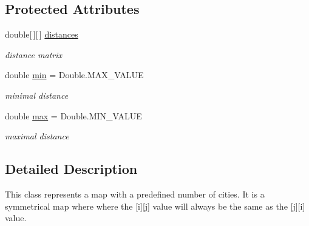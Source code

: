 \subsection*{Protected Attributes}
\begin{DoxyCompactItemize}
\item 
\hypertarget{classcom_1_1msu_1_1thief_1_1model_1_1SymmetricMap_a9807f5fdaef9e484d40fe13dfe7abc0d}{double\mbox{[}$\,$\mbox{]}\mbox{[}$\,$\mbox{]} \hyperlink{classcom_1_1msu_1_1thief_1_1model_1_1SymmetricMap_a9807f5fdaef9e484d40fe13dfe7abc0d}{distances}}\label{classcom_1_1msu_1_1thief_1_1model_1_1SymmetricMap_a9807f5fdaef9e484d40fe13dfe7abc0d}

\begin{DoxyCompactList}\small\item\em distance matrix \end{DoxyCompactList}\item 
\hypertarget{classcom_1_1msu_1_1thief_1_1model_1_1SymmetricMap_a0a8541e5a74bf2c3dbfa289fe7a91c3f}{double \hyperlink{classcom_1_1msu_1_1thief_1_1model_1_1SymmetricMap_a0a8541e5a74bf2c3dbfa289fe7a91c3f}{min} = Double.\-M\-A\-X\-\_\-\-V\-A\-L\-U\-E}\label{classcom_1_1msu_1_1thief_1_1model_1_1SymmetricMap_a0a8541e5a74bf2c3dbfa289fe7a91c3f}

\begin{DoxyCompactList}\small\item\em minimal distance \end{DoxyCompactList}\item 
\hypertarget{classcom_1_1msu_1_1thief_1_1model_1_1SymmetricMap_a688182c87e1c31cb09a004532eb699b9}{double \hyperlink{classcom_1_1msu_1_1thief_1_1model_1_1SymmetricMap_a688182c87e1c31cb09a004532eb699b9}{max} = Double.\-M\-I\-N\-\_\-\-V\-A\-L\-U\-E}\label{classcom_1_1msu_1_1thief_1_1model_1_1SymmetricMap_a688182c87e1c31cb09a004532eb699b9}

\begin{DoxyCompactList}\small\item\em maximal distance \end{DoxyCompactList}\end{DoxyCompactItemize}


\subsection{Detailed Description}
This class represents a map with a predefined number of cities. It is a symmetrical map where where the \mbox{[}i\mbox{]}\mbox{[}j\mbox{]} value will always be the same as the \mbox{[}j\mbox{]}\mbox{[}i\mbox{]} value.

